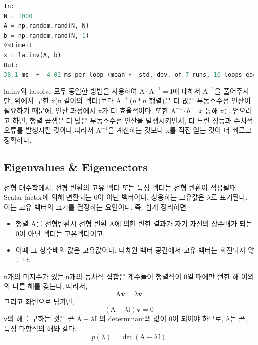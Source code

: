 \documentclass[11pt]{article}
\begin{document}
\begin{lstlisting}[language=Python]
In:
N = 1000
A = np.random.rand(N, N)
b = np.random.rand(N, 1)
%%timeit
x = la.inv(A, b)
Out:
38.1 ms  +- 4.02 ms per loop (mean +- std. dev. of 7 runs, 10 loops each)
\end{lstlisting}
la.inv와 la.solve 모두 동일한 방법을 사용하여 $\mathrm A\cdot \mathrm A^{-1} = \mathrm I$에 대해서 $\mathrm A^{-1}$을 풀어주지만, 위에서 구한 x(n 길이의 벡터)보다  $\mathrm A^{-1}$ ($n * n$ 행렬)은 더 많은 부동소수점 연산이 필요하기 때문에, 연산 과정에서 x가 더 효율적이다. 또한  $\mathrm A^{-1} \cdot b = x$ 통해 x를 얻으려고 하면, 행렬 곱셈은 더 많은 부동소수점 연산을 발생시키면서, 더 느린 성능과 수치적 오류를 발생시킬 것이다.따라서  $\mathrm A^{-1}$을 계산하는 것보다 x를 직접 얻는 것이 더 빠르고 정확하다.

\subsection{Eigenvalues \& Eigencectors} 
선형 대수학에서, 선형 변환의 고유 벡터 또는 특성 벡터는 선형 변환이 적용될때 Scalar factor에 의해 변환되는 0이 아닌 벡터이다. 상응하는 고유값은 $\lambda$로 표기된다. 이는 고유 벡터의 크기를 결정하는 요인이다. 즉, 쉽게 정리하면
\begin{itemize}
    \item 행렬 A를 선형변환시 선형 변환 A에 의한 변한 결과가 자기 자신의 상수배가 되는 0이 아닌 벡터는 고유벡터이고,
    \item 이때 그 상수배의 값은 고유값이다. 다차원 벡터 공간에서 고유 벡터는 회전되지 않는다. 
\end{itemize}
n개의 미지수가 있는 n개의 동차식 집합은 계수들이 행렬식이 0일 때에만 뻔한 해 이외의 다른 해를 갖는다. 따라서,
\begin{equation}
\mathrm A\mathbf v = \lambda\mathbf v
\end{equation}
그리고 좌변으로 넘기면,
\begin{equation}
(\mathrm A - \lambda\mathrm I)\mathbf v = 0
\end{equation}
v의 해를 구하는 것은 곧 $\mathrm A - \lambda\mathrm I$ 의 determinant의 값이 0이 되어야 하므로, $\lambda$는 곧, 특성 다항식의 해와 같다.
\begin{equation}
p(\lambda) = \det(\mathrm A - \lambda\mathrm I)
\end{equation}
\end{document}
